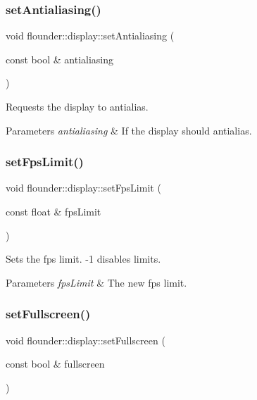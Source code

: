 \subsubsection{\texorpdfstring{set\+Antialiasing()}{setAntialiasing()}}
{\footnotesize\ttfamily void flounder\+::display\+::set\+Antialiasing (\begin{DoxyParamCaption}\item[{const bool \&}]{antialiasing }\end{DoxyParamCaption})\hspace{0.3cm}{\ttfamily [inline]}}



Requests the display to antialias. 


\begin{DoxyParams}{Parameters}
{\em antialiasing} & If the display should antialias. \\
\hline
\end{DoxyParams}
\mbox{\label{classflounder_1_1display_acdcc3dce1dba837c5abde1b51004725a}} 
\subsubsection{\texorpdfstring{set\+Fps\+Limit()}{setFpsLimit()}}
{\footnotesize\ttfamily void flounder\+::display\+::set\+Fps\+Limit (\begin{DoxyParamCaption}\item[{const float \&}]{fps\+Limit }\end{DoxyParamCaption})\hspace{0.3cm}{\ttfamily [inline]}}



Sets the fps limit. -\/1 disables limits. 


\begin{DoxyParams}{Parameters}
{\em fps\+Limit} & The new fps limit. \\
\hline
\end{DoxyParams}
\mbox{\label{classflounder_1_1display_ae5ee27f982e6a947305dc6e71a23021b}} 
\subsubsection{\texorpdfstring{set\+Fullscreen()}{setFullscreen()}}
{\footnotesize\ttfamily void flounder\+::display\+::set\+Fullscreen (\begin{DoxyParamCaption}\item[{const bool \&}]{fullscreen }\end{DoxyParamCaption})}



